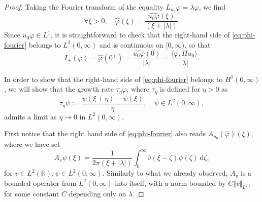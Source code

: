 \documentclass[english, 12pt]{amsart}%
\newcommand{\R}{\mathbb{R}}
\newcommand{\dd}{\,\mathrm{d}}
\numberwithin{equation}{section}
\begin{document}
\begin{proof}
Taking the Fourier transform of the equality $L_{u_0}\varphi=\lambda\varphi$, we find
\begin{equation}\label{eq:phi-fourier}
\forall \xi>0,\quad \widehat{\varphi}(\xi)=\frac{\widehat{u_0\varphi}(\xi)}{(\xi+|\lambda|)}.
\end{equation}
Since $u_0\varphi \in L^1$, it is straightforward to check that the right-hand side of \eqref{eq:phi-fourier} belongs to $L^2(0,\infty)$ and is continuous on $[0,\infty)$, so that
\begin{equation}\label{I+phi}
I_+(\varphi )=\widehat \varphi (0^+)=\frac{\widehat{u_0\varphi}(0)}{|\lambda|}=\frac{\langle \varphi, \Pi u_0\rangle }{|\lambda|}.
\end{equation}

In order to show that the right-hand side of \eqref{eq:phi-fourier} belongs to $H^1(0,\infty)$, we will show that the growth rate $\tau_\eta\widehat{\varphi}$, where $\tau_\eta$ is defined for $\eta>0$ as
\[
\tau_\eta \psi:=\frac{\psi(\xi+\eta)-\psi(\xi)}{\eta},
\quad \psi\in L^2(0,\infty),
\]
admits a limit as $\eta\to 0$ in $L^2(0,\infty)$.

 First notice that the right hand side of \eqref{eq:phi-fourier} also reads $A_{u_0}(\widehat \varphi) (\xi )$, where we have set
 \[ A_v \psi (\xi )=\frac{1}{2\pi (\xi +|\lambda |)}\int_0^\infty \widehat v(\xi -\zeta)\psi (\zeta)\dd\zeta ,\]
 for $v\in L^2(\R), \psi \in L^2(0,\infty )$.
Similarly to what we already observed, $A_v $ is a bounded operator from $L^2(0,\infty )$ into itself, with a norm bounded by $C\Vert v\Vert_{L^2}$, for some constant $C$ depending only on $\lambda $.


\end{proof}
\end{document}
